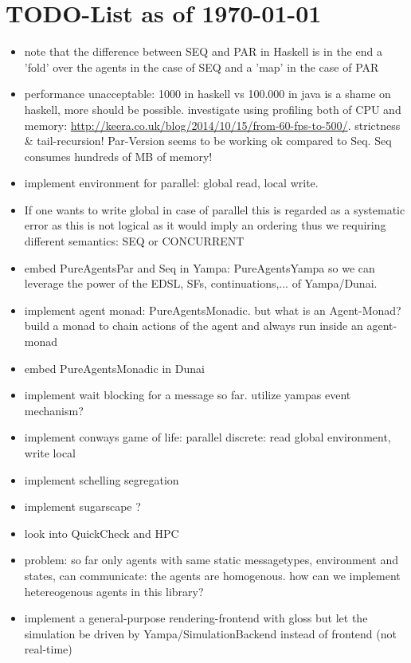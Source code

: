 \section{TODO-List as of \today}

\begin{itemize}
\item note that the difference between SEQ and PAR in Haskell is in the end a 'fold' over the agents in the case of SEQ and a 'map' in the case of PAR
\item performance unacceptable: 1000 in haskell vs 100.000 in java is a shame on haskell, more should be possible. investigate using profiling both of CPU and memory: \url{http://keera.co.uk/blog/2014/10/15/from-60-fps-to-500/}. strictness \& tail-recursion!
	Par-Version seems to be working ok compared to Seq. Seq consumes hundreds of MB of memory!


\item implement environment for parallel: global read, local write. 

\item If one wants to write global in case of parallel this is regarded as a systematic error as this is not logical as it would imply an ordering thus we requiring different semantics: SEQ or CONCURRENT

\item embed PureAgentsPar and Seq in Yampa: PureAgentsYampa so we can leverage the power of the EDSL, SFs, continuations,... of Yampa/Dunai.
\item implement agent monad: PureAgentsMonadic. but what is an Agent-Monad? build a monad to chain actions of the agent and always run inside an agent-monad
\item embed PureAgentsMonadic in Dunai

\item implement wait blocking for a message so far. utilize yampas event mechanism?

\item implement conways game of life: parallel discrete: read global environment, write local
\item implement schelling segregation
\item implement sugarscape ?


\item look into QuickCheck and HPC
\item problem: so far only agents with same static messagetypes, environment and states, can communicate: the agents are homogenous. how can we implement hetereogenous agents in this library?
\item implement a general-purpose rendering-frontend with gloss but let the simulation be driven by Yampa/SimulationBackend instead of frontend (not real-time)



\end{itemize}
